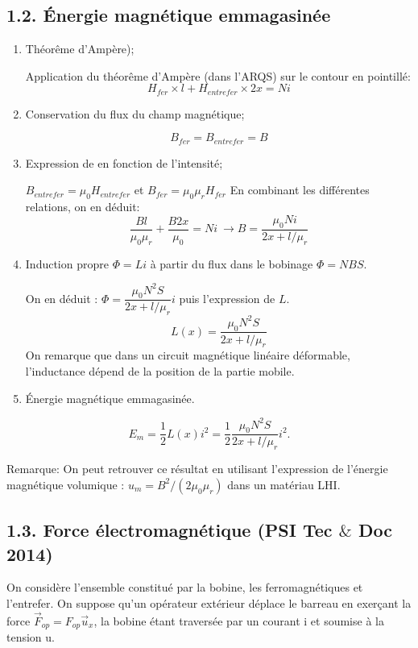\documentclass[french, a4paper, 10pt, twocolumn, landscape]{article}
\begin{document}
\subsection*{1.2. Énergie magnétique emmagasinée}
\begin{enumerate}
    \item Théorême d'Ampère);

Application du théorême d'Ampère (dans l'ARQS) sur le contour en pointillé: 
\begin{equation}
	H_{fer}\times l + H_{entrefer}\times 2x = Ni
\end{equation}
	\item Conservation du flux du champ magnétique;
	
\begin{equation}
	B_{fer}=B_{entrefer}=B
\end{equation}

    \item Expression de  en fonction de l'intensité;

$B_{entrefer}=\mu_0 H_{entrefer}$ et $B_{fer} = \mu_0\mu_rH_{fer}$ En combinant les différentes relations, on en déduit: 
\begin{equation}
	\dfrac{Bl}{\mu_0\mu_r}+\dfrac{B2x}{\mu_0}=Ni\ \rightarrow B = \dfrac{\mu_0Ni}{2x+l/\mu_r}
\end{equation}

    \item Induction propre $\Phi=Li$ à partir du flux dans le bobinage $\Phi=NBS$.

On en déduit : $\Phi = \dfrac{\mu_0N^2S}{2x+l/\mu_r}i$ puis l'expression de $L$.
\begin{equation}
	L(x)=\dfrac{\mu_0N^2S}{2x+l/\mu_r}
\end{equation}
On remarque que dans un circuit magnétique linéaire déformable, l'inductance dépend de la position de la partie mobile.

    \item Énergie magnétique emmagasinée.
\end{enumerate}
\begin{equation}
	E_m = \dfrac{1}{2}L(x)i^2 = \dfrac{1}{2}\dfrac{\mu_0N^2S}{2x+l/\mu_r}i^2.
\end{equation}

Remarque: On peut retrouver ce résultat en utilisant l'expression de l'énergie magnétique volumique : $u_m=B^2/(2\mu_0\mu_r)$ dans un matériau LHI.

\subsection*{1.3. Force électromagnétique (PSI Tec $\&$ Doc 2014)}
On considère l'ensemble constitué par la bobine, les ferromagnétiques et l'entrefer. On suppose qu’un opérateur extérieur déplace le barreau en exerçant la force $\vec{F}_{op}=F_{op}\vec{u}_x$, la bobine
étant traversée par un courant i et soumise à la tension u.
\end{document}

